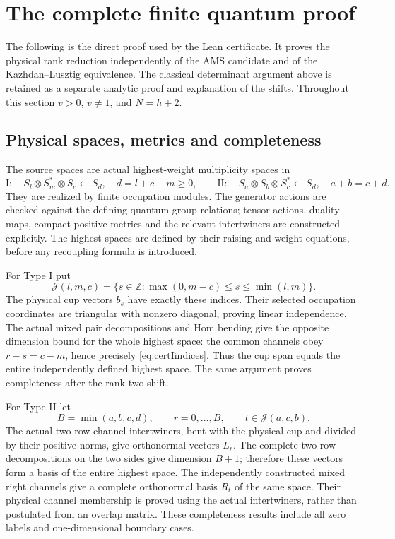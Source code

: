 \documentclass[10pt,a4paper]{article}
\newenvironment{revision}{\begingroup}{\endgroup}
\begin{document}
\begin{revision}
\section{The complete finite quantum proof}\label{sec:certified}
The following is the direct proof used by the Lean certificate. It proves
the physical rank reduction independently of the AMS candidate and of the
Kazhdan--Lusztig equivalence. The classical determinant argument above is
retained as a separate analytic proof and explanation of the shifts.
Throughout this section $v>0$, $v\ne1$, and $N=h+2$.

\subsection{Physical spaces, metrics and completeness}
The source spaces are actual highest-weight multiplicity spaces in
\[
 \mathrm I:\quad S_l\otimes S_m^*\otimes S_c\longleftarrow S_d,
 \quad d=l+c-m\ge0,
 \qquad
 \mathrm {II}:\quad S_a\otimes S_b\otimes S_c^*\longleftarrow S_d,
 \quad a+b=c+d.
\]
They are realized by finite occupation modules. The generator actions are
checked against the defining quantum-group relations; tensor actions,
duality maps, compact positive metrics and the relevant intertwiners are
constructed explicitly. The highest spaces are defined by their raising
and weight equations, before any recoupling formula is introduced.

For Type I put
\begin{equation}\label{eq:certIindices}
 \mathcal J(l,m,c)=\{s\in\mathbb Z:\max(0,m-c)\le s\le\min(l,m)\}.
\end{equation}
The physical cup vectors $b_s$ have exactly these indices. Their selected
occupation coordinates are triangular with nonzero diagonal, proving
linear independence. The actual mixed pair decompositions and Hom bending
give the opposite dimension bound for the whole highest space: the common
channels obey $r-s=c-m$, hence precisely \eqref{eq:certIindices}.
Thus the cup span equals the entire independently defined highest space.
The same argument proves completeness after the rank-two shift.

For Type II let
\begin{equation}\label{eq:certIIindices}
 B=\min(a,b,c,d),\qquad r=0,\ldots,B,
 \qquad t\in\mathcal J(a,c,b).
\end{equation}
The actual two-row channel intertwiners, bent with the physical cup and
divided by their positive norms, give orthonormal vectors $L_r$.
The complete two-row decompositions on the two sides give dimension
$B+1$; therefore these vectors form a basis of the entire highest space.
The independently constructed mixed right channels give a complete
orthonormal basis $R_t$ of the same space. Their physical channel membership
is proved using the actual intertwiners, rather than postulated from an
overlap matrix. These completeness results include all zero labels and
one-dimensional boundary cases.


\end{revision}
\end{document}
